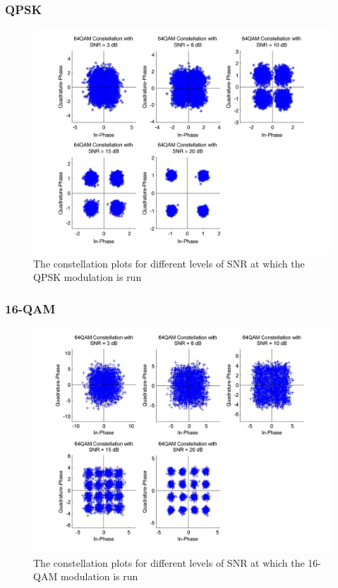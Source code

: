 \documentclass[]{article}
\begin{document}
\subsubsection{QPSK}
\begin{figure}[H]
\centering
\hspace*{-2cm}\includegraphics[width=1.3\textwidth]{qpConst.jpg}
\caption{The constellation plots for different levels of SNR at which the QPSK modulation is run}
\end{figure}
\subsubsection{16-QAM}
\begin{figure}[H]
\centering
\hspace*{-2cm}\includegraphics[width=1.3\textwidth]{qam16Const.jpg}
\caption{The constellation plots for different levels of SNR at which the 16-QAM modulation is run}
\end{figure}
\end{document}
